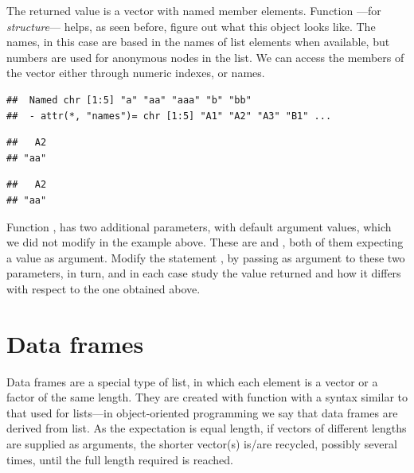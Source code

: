 \documentclass[krantz2]{krantz}\usepackage{knitr}%
\begin{document}
The returned value is a vector with named member elements. Function ---for \emph{structure}--- helps, as seen before, figure out what this object looks like. The names, in this case are based in the names of list elements when available, but numbers are used for anonymous nodes in the list. We can access the members of the vector either through numeric indexes, or names.

\begin{knitrout}\footnotesize
{}\color{fgcolor}\begin{kframe}
\begin{alltt}
\end{alltt}
\begin{verbatim}
##  Named chr [1:5] "a" "aa" "aaa" "b" "bb"
##  - attr(*, "names")= chr [1:5] "A1" "A2" "A3" "B1" ...
\end{verbatim}
\begin{alltt}
\hlstd{c.vec[}\hlstd{]}
\end{alltt}
\begin{verbatim}
##   A2 
## "aa"
\end{verbatim}
\begin{alltt}
\hlstd{c.vec[}\hlstd{]}
\end{alltt}
\begin{verbatim}
##   A2 
## "aa"
\end{verbatim}
\end{kframe}
\end{knitrout}

\begin{playground}
Function , has two additional parameters, with default argument values, which we did not modify in the example above. These are  and , both of them expecting a  value as argument. Modify the statement , by passing  as argument to these two parameters, in turn, and in each case study the value returned and how it differs with respect to the one obtained above.
\end{playground}



\section{Data frames}\label{sec:R:data:frames}
Data frames are a special type of list, in which each element is a vector or a factor of the same length. They are created with function  with a syntax similar to that used for lists---in object-oriented programming we say that data frames are derived from list. As the expectation is equal length, if vectors of different lengths are supplied as arguments, the shorter vector(s) is/are recycled, possibly several times, until the full length required is reached.
\end{document}
